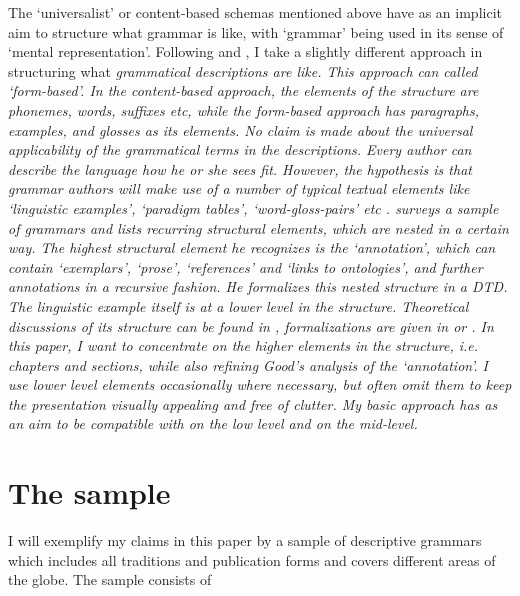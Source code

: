 \documentclass[a4paper,12pt]{article}
\begin{document}
The `universalist' or content-based schemas mentioned above have as an implicit aim to structure what grammar is like, with `grammar' being used in its sense of `mental representation'. Following \citet{Good2004} and \citet{Nordhoff2008jldc}, I take a slightly different approach in structuring what \em grammatical descriptions \em are like. This approach can called `form-based'. In the content-based approach, the elements of the   structure are phonemes, words,  suffixes etc, while the form-based approach has paragraphs, examples,  and glosses as its elements. No claim is made about the universal applicability of the grammatical terms in the descriptions. Every author can describe the language how he or she sees fit. However, the hypothesis is that grammar authors will make use of a number of typical textual elements like `linguistic examples', `paradigm tables',  `word-gloss-pairs' etc \citep{Good2004}. \citet{Good2004} surveys a sample of grammars and lists recurring structural elements, which are nested in a certain way. The highest structural element he recognizes is the `annotation', which can contain `exemplars', `prose', `references' and `links to ontologies', and further annotations in a recursive fashion. He formalizes this nested structure in a DTD. The linguistic example itself is at a lower level in the structure. Theoretical discussions of its structure can be found in \citet{Drude2002},   formalizations are given in \citet{Peterson2002} or \citet{BowEtAl2003}. In this paper, I want to concentrate on the higher elements in the structure, i.e. chapters and sections, while also refining Good's analysis of the `annotation'. I use lower level elements occasionally where necessary, but often omit them to keep the presentation visually appealing and free of clutter. My basic approach has as an aim to be compatible with \citet{BowEtAl2003} on the low level and \citet{Good2004} on the mid-level.

\section{ The sample}


I will exemplify my claims in this paper by a sample of descriptive grammars which includes all traditions and publication forms and covers different areas of the globe. The sample consists of
\end{document}
